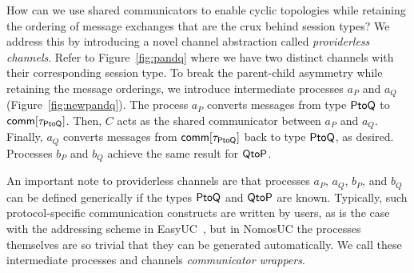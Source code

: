 How can we use shared communicators to enable cyclic topologies while retaining the ordering
of message exchanges that are the crux behind session types?
We address this by introducing a novel channel abstraction called \emph{providerless channels}.
Refer to Figure~\ref{fig:pandq} where we have two distinct channels with their corresponding
session type.
To break the parent-child asymmetry while retaining  the message orderings, we introduce
intermediate processes $a_P$ and $a_Q$ (Figure~\ref{fig:newpandq}). The process $a_P$ converts
messages from type $\mathsf{PtoQ}$ to $\mathsf{comm[\tau_{PtoQ}]}$.
Then, $C$ acts as the shared communicator between $a_P$ and $a_Q$.
Finally, $a_Q$ converts messages from $\mathsf{comm[\tau_{PtoQ}]}$ back to type $\mathsf{PtoQ}$, as desired.
Processes $b_P$ and $b_Q$ achieve the same result for $\mathsf{QtoP}$.

An important note to providerless channels are that processes $a_P$, $a_Q$, $b_P$, and $b_Q$ can be defined
generically if the types $\mathsf{PtoQ}$ and $\mathsf{QtoP}$ are known.
Typically, such protocol-specific communication constructs are written by users, as is the case with the addressing scheme in EasyUC~\cite{easyuc},
but in NomosUC the processes themselves are so trivial that they can be generated automatically.
We call these intermediate processes and channels \emph{communicator wrappers}.

